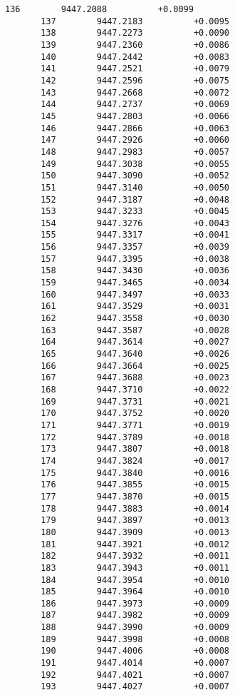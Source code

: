 \documentclass[11pt]{article}
\begin{document}
\begin{Verbatim}[commandchars=\\\{\}]
       136        9447.2088          +0.0099
       137        9447.2183          +0.0095
       138        9447.2273          +0.0090
       139        9447.2360          +0.0086
       140        9447.2442          +0.0083
       141        9447.2521          +0.0079
       142        9447.2596          +0.0075
       143        9447.2668          +0.0072
       144        9447.2737          +0.0069
       145        9447.2803          +0.0066
       146        9447.2866          +0.0063
       147        9447.2926          +0.0060
       148        9447.2983          +0.0057
       149        9447.3038          +0.0055
       150        9447.3090          +0.0052
       151        9447.3140          +0.0050
       152        9447.3187          +0.0048
       153        9447.3233          +0.0045
       154        9447.3276          +0.0043
       155        9447.3317          +0.0041
       156        9447.3357          +0.0039
       157        9447.3395          +0.0038
       158        9447.3430          +0.0036
       159        9447.3465          +0.0034
       160        9447.3497          +0.0033
       161        9447.3529          +0.0031
       162        9447.3558          +0.0030
       163        9447.3587          +0.0028
       164        9447.3614          +0.0027
       165        9447.3640          +0.0026
       166        9447.3664          +0.0025
       167        9447.3688          +0.0023
       168        9447.3710          +0.0022
       169        9447.3731          +0.0021
       170        9447.3752          +0.0020
       171        9447.3771          +0.0019
       172        9447.3789          +0.0018
       173        9447.3807          +0.0018
       174        9447.3824          +0.0017
       175        9447.3840          +0.0016
       176        9447.3855          +0.0015
       177        9447.3870          +0.0015
       178        9447.3883          +0.0014
       179        9447.3897          +0.0013
       180        9447.3909          +0.0013
       181        9447.3921          +0.0012
       182        9447.3932          +0.0011
       183        9447.3943          +0.0011
       184        9447.3954          +0.0010
       185        9447.3964          +0.0010
       186        9447.3973          +0.0009
       187        9447.3982          +0.0009
       188        9447.3990          +0.0009
       189        9447.3998          +0.0008
       190        9447.4006          +0.0008
       191        9447.4014          +0.0007
       192        9447.4021          +0.0007
       193        9447.4027          +0.0007

\end{Verbatim}
\end{document}
